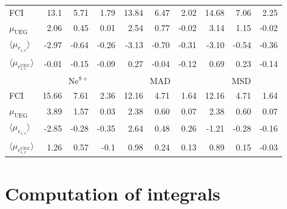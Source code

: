 \documentclass[aip,jcp,reprint,noshowkeys,superscriptaddress]{revtex4-1}
\newcommand{\muueg}{\mu_{\text{UEG}}}
\newcommand{\murscav}{\langle \mu_{r_{s,c}}\rangle}
\newcommand{\mursclda}{\langle \mu_{r_{s,c}^{\text{UEG}}}\rangle}
\begin{document}
\begin{table}
\begin{ruledtabular}
\begin{tabular}{l|rrr||rrr||rrr|}
 FCI         &  13.1   &   5.71   &  1.79    &  13.84  &   6.47   &  2.02   &  14.68  &   7.06   &  2.25    \\  
$\muueg$     &  2.06   &   0.45   &  0.01    &  2.54   &   0.77   & -0.02   &  3.14   &   1.15   & -0.02    \\  
$\murscav$   &  -2.97  &  -0.64   &  -0.26   & -3.13   &  -0.70   & -0.31   & -3.10   &  -0.54   & -0.36    \\  
$\mursclda$  &  -0.01  &  -0.15   &  -0.09   &  0.27   &  -0.04   & -0.12   &  0.69   &   0.23   & -0.14    \\  
\hline
             &\multicolumn{3}{c}{Ne$^{8+}$}  & \multicolumn{3}{c}{MAD} & \multicolumn{3}{c}{MSD}    \\
 FCI         &  15.66  &   7.61   &  2.36    & 12.16   &    4.71  &    1.64   &  12.16   &   4.71   &    1.64   \\   
$\muueg$     &  3.89   &   1.57   &  0.03    & 2.38    &    0.60  &    0.07   &   2.38   &   0.60   &    0.07   \\   
$\murscav$   &  -2.85  &  -0.28   & -0.35    & 2.64    &    0.48  &    0.26   &  -1.21   &  -0.28   &   -0.16   \\   
$\mursclda$  &  1.26   &   0.57   & -0.1     & 0.98    &    0.24  &    0.13   &   0.89   &   0.15   &   -0.03   \\   
\end{tabular}
\end{ruledtabular}
\end{table}

\section{Computation of integrals}
\end{document}
